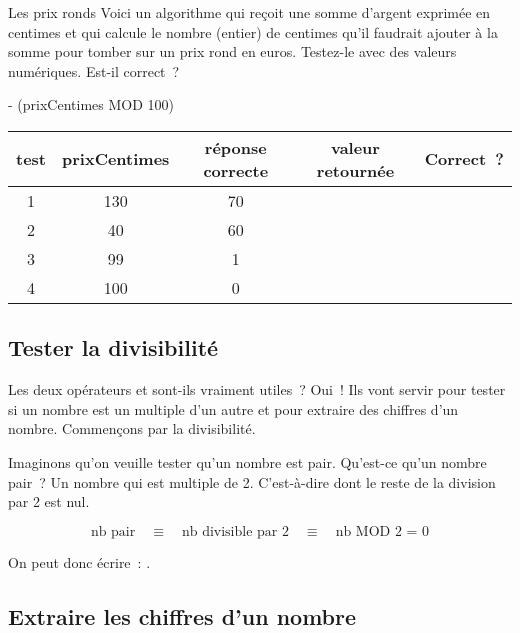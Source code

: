 			\begin{Exercice}{Les prix ronds}
				Voici un algorithme qui reçoit une somme d’argent exprimée en centimes
				et qui calcule le nombre (entier) de centimes qu’il
				faudrait ajouter à la somme pour tomber sur un prix rond en euros.
				Testez-le avec des valeurs numériques. Est-il correct~?
				
				\begin{LDA}
					 - (prixCentimes MOD 100)
				\EndAlgo
				\end{LDA}
				
				\begin{center}
				\begin{tabular}{|c|c|c|c|c|}
				\hline
				test \no & prixCentimes & réponse correcte & valeur retournée & Correct~? \\\hline
				\hline 
				1 & 130 & 70 &  & \\\hline
				2 & 40  & 60 &  & \\\hline
				3 & 99  & 1  &  & \\\hline
				4 & 100 & 0  &  & \\\hline
				\end{tabular}
				\end{center}
				
			\end{Exercice}
			
			
		\subsection{Tester la divisibilité}
		
			Les deux opérateurs  et 
			sont-ils vraiment utiles~?
			Oui~! Ils vont servir pour tester si un nombre
			est un multiple d’un autre et pour extraire
			des chiffres d’un nombre.
			Commençons par la divisibilité.

			Imaginons qu’on veuille tester qu’un nombre est pair.
			Qu’est-ce qu’un nombre pair~? Un nombre qui est multiple de 2.
			C’est-à-dire dont le reste de la division par 2 est nul.
			
			\[
			\textrm{nb pair} 
				\quad\equiv\quad \textrm{nb divisible par 2} 
				\quad\equiv\quad \textrm{nb MOD 2 = 0} 
			\]
			
			On peut donc écrire~: .

		\subsection{Extraire les chiffres d’un nombre}
		
